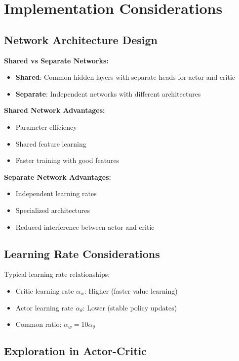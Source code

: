 \section{Implementation Considerations}

\subsection{Network Architecture Design}

\textbf{Shared vs Separate Networks:}
\begin{itemize}
    \item \textbf{Shared}: Common hidden layers with separate heads for actor and critic
    \item \textbf{Separate}: Independent networks with different architectures
\end{itemize}

\textbf{Shared Network Advantages:}
\begin{itemize}
    \item Parameter efficiency
    \item Shared feature learning
    \item Faster training with good features
\end{itemize}

\textbf{Separate Network Advantages:}
\begin{itemize}
    \item Independent learning rates
    \item Specialized architectures
    \item Reduced interference between actor and critic
\end{itemize}

\subsection{Learning Rate Considerations}

Typical learning rate relationships:
\begin{itemize}
    \item Critic learning rate $\alpha_w$: Higher (faster value learning)
    \item Actor learning rate $\alpha_\theta$: Lower (stable policy updates)
    \item Common ratio: $\alpha_w = 10 \alpha_\theta$
\end{itemize}

\subsection{Exploration in Actor-Critic}

